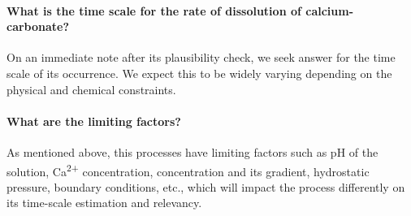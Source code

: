 \paragraph*{What is the time scale for the rate of dissolution of calcium-carbonate?} On an immediate note after its plausibility check, we seek answer for the time scale of its occurrence. We expect this to be widely varying depending on the physical and chemical constraints.

\paragraph*{What are the limiting factors?} As mentioned above, this processes have limiting factors such as pH of the solution, Ca\textsuperscript{2+} concentration,  concentration and its gradient, hydrostatic pressure, boundary conditions, etc.,  which will impact the process differently on its time-scale estimation and relevancy. 
\endinput